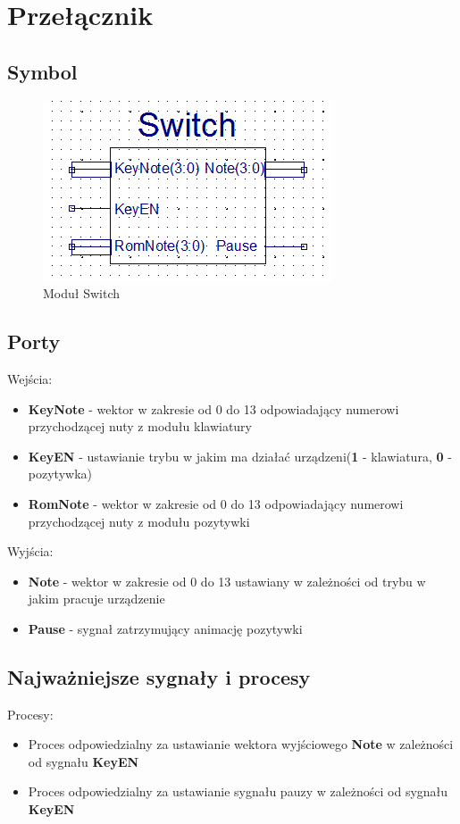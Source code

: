 \documentclass[a4paper]{report}
\begin{document}
	\newpage
	\section{Przełącznik}
		\subsection{Symbol}	
			\begin{figure}[h!]
				\centering
				\includegraphics{switch2.png}
				\caption{Moduł Switch}
			\end{figure}
			
		\subsection{Porty}
			{\Large Wejścia:}
			\begin{itemize}	 
				\item \textbf{KeyNote} - wektor w zakresie od 0 do 13 odpowiadający numerowi przychodzącej nuty z modułu klawiatury
				\item \textbf{KeyEN} - ustawianie trybu w jakim ma działać urządzeni(\textbf{1} - klawiatura, \textbf{0} - pozytywka)
				\item \textbf{RomNote} - wektor w zakresie od 0 do 13 odpowiadający numerowi przychodzącej nuty z modułu pozytywki
			\end{itemize}
			{\Large Wyjścia:}
			\begin{itemize} 
				\item \textbf{Note} - wektor w zakresie od 0 do 13 ustawiany w zależności od trybu w jakim pracuje urządzenie
				\item \textbf{Pause} - sygnał zatrzymujący animację pozytywki
			\end{itemize}
			
		\subsection{Najważniejsze sygnały i procesy}
			{\Large Procesy:}
			\begin{itemize}
				\item Proces odpowiedzialny za ustawianie wektora wyjściowego \textbf{Note} w zależności od sygnału \textbf{KeyEN}\\
					
				\item Proces odpowiedzialny za ustawianie sygnału pauzy w zależności od sygnału \textbf{KeyEN}\\
					
			\end{itemize}
	
\end{document}
